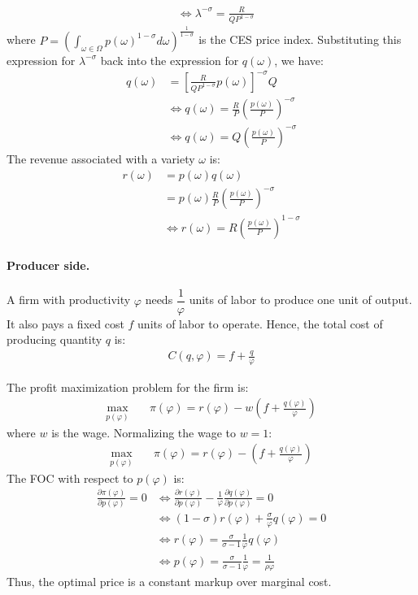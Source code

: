 \begin{solution}
\begin{align*}
        &\iff \lambda^{-\sigma} = \frac{R}{Q P^{1 - \sigma}} 
    \end{align*}
    where $P = \left( \int_{\omega \in \Omega} p(\omega)^{1 - \sigma} d\omega \right)^{\frac{1}{1 - \sigma}}$ is the CES price index. Substituting this expression for $\lambda^{-\sigma}$ back into the expression for $q(\omega)$, we have:
    \begin{align*}
        q(\omega) &= \left[ \frac{R}{Q P^{1 - \sigma}} p(\omega) \right]^{-\sigma} Q \\
        &\iff q(\omega) = \frac{R}{P} \left( \frac{p(\omega)}{P} \right)^{-\sigma}\\
        &\iff q(\omega) = Q \left( \frac{p(\omega)}{P} \right)^{-\sigma}
    \end{align*}
    The revenue associated with a variety $\omega$ is:
    \begin{align*}
        r(\omega) &= p(\omega) q(\omega) \\
        &= p(\omega) \frac{R}{P} \left( \frac{p(\omega)}{P} \right)^{-\sigma} \\
        &\iff r(\omega) = R \left( \frac{p(\omega)}{P} \right)^{1 - \sigma}
    \end{align*}
    
    \paragraph{Producer side.} A firm with productivity $\varphi$ needs $\dfrac{1}{\varphi}$ units of labor to produce one unit of output. It also pays a fixed cost $f$ units of labor to operate. Hence, the total cost of producing quantity $q$ is:
    \begin{align*}
        C(q, \varphi) = f + \frac{q}{\varphi} 
    \end{align*}
    
    The profit maximization problem for the firm is:
    \begin{align*}
        \max_{p(\varphi)} \quad & \pi(\varphi) = r(\varphi) - w\left( f + \frac{q(\varphi)}{\varphi} \right)
    \end{align*}
    where $w$ is the wage. Normalizing the wage to $w = 1$:
    \begin{align*}
        \max_{p(\varphi)} \quad & \pi(\varphi) = r(\varphi) - \left( f + \frac{q(\varphi)}{\varphi} \right)
    \end{align*}
    The FOC with respect to $p(\varphi)$ is:
    \begin{align*}
        \frac{\partial \pi(\varphi)}{\partial p(\varphi)} = 0 &\iff \frac{\partial r(\varphi)}{\partial p(\varphi)} - \frac{1}{\varphi} \frac{\partial q(\varphi)}{\partial p(\varphi)} = 0 \\
        &\iff (1 - \sigma) r(\varphi) + \frac{\sigma}{\varphi} q(\varphi) = 0 \\
        &\iff r(\varphi) = \frac{\sigma}{\sigma - 1} \frac{1}{\varphi} q(\varphi) \\
        &\iff p(\varphi) = \frac{\sigma}{\sigma - 1} \frac{1}{\varphi} = \frac{1}{\rho\varphi} 
    \end{align*}
    Thus, the optimal price is a constant markup over marginal cost.
    

\end{solution}
